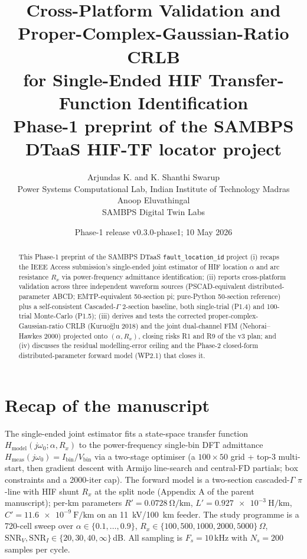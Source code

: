 \documentclass[11pt,a4paper]{article}
\title{\Large
  Cross-Platform Validation and Proper-Complex-Gaussian-Ratio CRLB\\
  for Single-Ended HIF Transfer-Function Identification\\[4pt]
  \large Phase-1 preprint of the SAMBPS DTaaS HIF-TF locator project}
\author{Arjundas K. and K. Shanthi Swarup\\
        \small Power Systems Computational Lab,
               Indian Institute of Technology Madras\\[2pt]
        Anoop Eluvathingal\\
        \small SAMBPS Digital Twin Labs}
\date{Phase-1 release v0.3.0-phase1; 10 May 2026}
\begin{document}
\maketitle

\begin{abstract}
This Phase-1 preprint of the SAMBPS DTaaS \texttt{fault\_location\_id}
project (i) recaps the IEEE Access submission's single-ended joint
estimator of HIF location $\alpha$ and arc resistance $R_x$ via
power-frequency admittance identification; (ii) reports cross-platform
validation across three independent waveform sources (PSCAD-equivalent
distributed-parameter ABCD; EMTP-equivalent 50-section pi; pure-Python
50-section reference) plus a self-consistent Cascaded-$\Gamma$
2-section baseline, both single-trial (P1.4) and 100-trial Monte-Carlo
(P1.5); (iii) derives and tests the corrected
proper-complex-Gaussian-ratio CRLB (Kuruoğlu 2018) and the joint
dual-channel FIM (Nehorai--Hawkes 2000) projected onto $(\alpha, R_x)$,
closing risks R1 and R9 of the v3 plan; and (iv) discusses the residual
modelling-error ceiling and the Phase-2 closed-form
distributed-parameter forward model (WP2.1) that closes it.
\end{abstract}

\section{Recap of the manuscript}\label{sec:recap}

The single-ended joint estimator
\cite{ArjundasSwarup2026HIFTF} fits a state-space transfer function
$H_{\mathrm{model}}(j\omega_0;\alpha,R_x)$ to the power-frequency
single-bin DFT admittance $H_{\mathrm{meas}}(j\omega_0) =
I_{\mathrm{bin}}/V_{\mathrm{bin}}$ via a two-stage optimiser (a
$100\times50$ grid + top-3 multi-start, then gradient descent with
Armijo line-search and central-FD partials; box constraints and a
2000-iter cap).  The forward model is a two-section cascaded-$\Gamma$
$\pi$-line with HIF shunt $R_x$ at the split node (Appendix A of the
parent manuscript); per-km parameters
$R'=\SI{0.0728}{\ohm\per\km}$,
$L'=\SI{0.927e-3}{\henry\per\km}$,
$C'=\SI{11.6e-9}{\farad\per\km}$ on an 11~kV/100~km feeder.  The
study programme is a 720-cell sweep over $\alpha\in\{0.1,\dots,0.9\}$,
$R_x\in\{100,500,1000,2000,5000\}\,\Omega$,
$\mathrm{SNR}_V,\mathrm{SNR}_I\in\{20,30,40,\infty\}$\,dB.  All
sampling is $F_s=10$\,kHz with $N_s=200$ samples per cycle.
\end{document}
